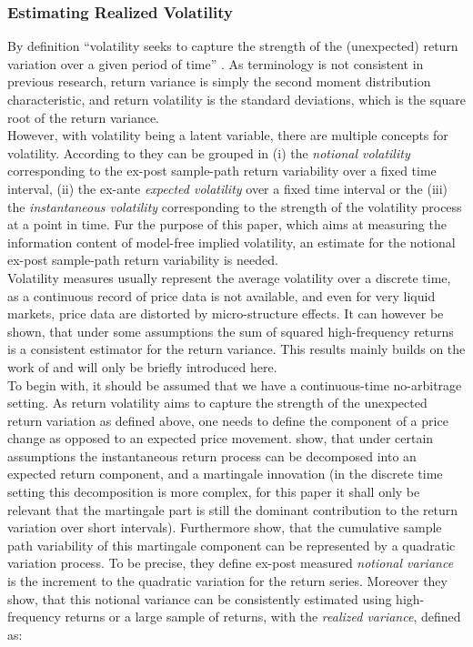\subsubsection{Estimating Realized Volatility}\label{sec:221RV}
By definition ``volatility seeks to capture the strength of the (unexpected) return variation over a given period of time'' \parencite[p.7]{andersen2001}. As terminology is not consistent in previous research, return variance is simply the second moment distribution characteristic, and return volatility is the standard deviations, which is the square root of the return variance. \\
However, with volatility being a latent variable, there are multiple concepts for volatility. According to \citeauthor{andersen2001} they can be grouped in (i) the \emph{notional volatility} corresponding to the ex-post sample-path return variability over a fixed time interval, (ii) the ex-ante \emph{expected volatility} over a fixed time interval or the (iii) the \emph{instantaneous volatility} corresponding to the strength of the volatility process at a point in time. Fur the purpose of this paper, which aims at measuring the information content of model-free implied volatility, an estimate for the  notional ex-post sample-path return variability is needed. \\
Volatility measures usually represent the average volatility over a discrete time, as a continuous record of price data is not available, and even for very liquid markets, price data are distorted by micro-structure effects. It can however be shown, that under some assumptions the sum of squared high-frequency returns is a consistent estimator for the return variance. This results mainly builds on the work of \parencite{andersen2001} and will only be briefly introduced here.\\
To begin with, it should be assumed that we have a continuous-time no-arbitrage setting. As return volatility aims to capture the strength of the unexpected return variation as defined above, one needs to define the component of a price change as opposed to an expected price movement.\textcite{andersen2001} show, that under certain assumptions the instantaneous return process can be decomposed into an expected return component, and a martingale innovation (in the discrete time setting this decomposition is more complex, for this paper it shall only be relevant that the martingale part is still the dominant contribution to the return variation over short intervals). Furthermore \textcite{andersen2001} show, that the cumulative sample path variability of this martingale component can be represented by a quadratic variation process. To be precise, they define ex-post measured \emph{notional variance} is the increment to the quadratic variation for the return series. Moreover they show, that this notional variance can be consistently estimated using high-frequency returns or a large sample of returns, with the \emph{realized variance}, defined as:
